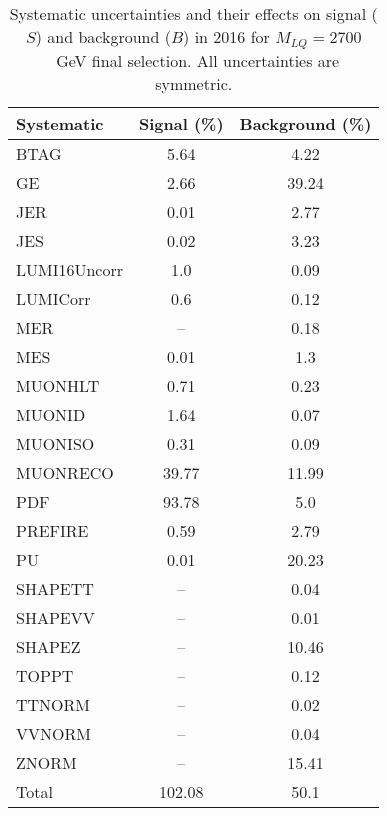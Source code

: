 \begin{table}[htbp]
\begin{center}
\caption{Systematic uncertainties and their effects on signal ($S$) and background ($B$) in 2016 for $M_{LQ}=2700$~GeV final selection. All uncertainties are symmetric.}
\begin{tabular}{lcc}
\hline\hline
Systematic & Signal (\%) & Background (\%) \\ \hline 
BTAG & 5.64 & 4.22\\ 
GE & 2.66 & 39.24\\ 
JER & 0.01 & 2.77\\ 
JES & 0.02 & 3.23\\ 
LUMI16Uncorr & 1.0 & 0.09\\ 
LUMICorr & 0.6 & 0.12\\ 
MER & -- & 0.18\\ 
MES & 0.01 & 1.3\\ 
MUONHLT & 0.71 & 0.23\\ 
MUONID & 1.64 & 0.07\\ 
MUONISO & 0.31 & 0.09\\ 
MUONRECO & 39.77 & 11.99\\ 
PDF & 93.78 & 5.0\\ 
PREFIRE & 0.59 & 2.79\\ 
PU & 0.01 & 20.23\\ 
SHAPETT & -- & 0.04\\ 
SHAPEVV & -- & 0.01\\ 
SHAPEZ & -- & 10.46\\ 
TOPPT & -- & 0.12\\ 
TTNORM & -- & 0.02\\ 
VVNORM & -- & 0.04\\ 
ZNORM & -- & 15.41\\ 
Total & 102.08 & 50.1\\ \hline \hline
\end{tabular}
\label{tab:SysUncertainties_uujj_2700}
\end{center}
\end{table}

